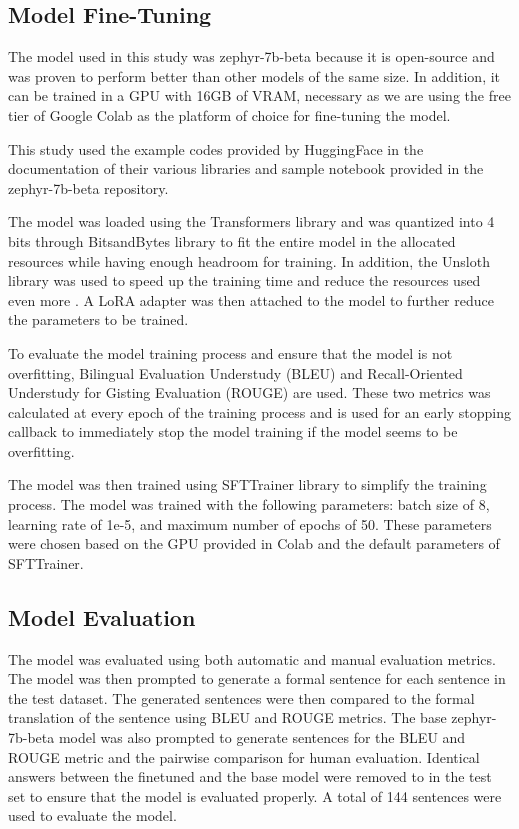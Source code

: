 \subsection{Model Fine-Tuning}
The model used in this study was zephyr-7b-beta because it is open-source and was proven to perform better than other models of the same size. In addition, it can be trained in a GPU with 16GB of VRAM, necessary as we are using the free tier of Google Colab as the platform of choice for fine-tuning the model.

This study used the example codes provided by HuggingFace in the documentation of their various libraries and sample notebook provided in the zephyr-7b-beta repository. 

The model was loaded using the Transformers library and was quantized into 4 bits through BitsandBytes library to fit the entire model in the allocated resources while having enough headroom for training. In addition, the Unsloth library was used to speed up the training time and reduce the resources used even more \cite{unsloth}. A LoRA adapter was then attached to the model to further reduce the parameters to be trained.

To evaluate the model training process and ensure that the model is not overfitting, Bilingual Evaluation Understudy (BLEU) and Recall-Oriented Understudy for Gisting Evaluation (ROUGE) are used. These two metrics was calculated at every epoch of the training process and is used for an early stopping callback to immediately stop the model training if the model seems to be overfitting.

The model was then trained using SFTTrainer library to simplify the training process. The model was trained with the following parameters: batch size of 8, learning rate of 1e-5, and maximum number of epochs of 50. These parameters were chosen based on the GPU provided in Colab and the default parameters of SFTTrainer.

\subsection{Model Evaluation}
The model was evaluated using both automatic and manual evaluation metrics. The model was then prompted to generate a formal sentence for each sentence in the test dataset. The generated sentences were then compared to the formal translation of the sentence using BLEU and ROUGE metrics. The base zephyr-7b-beta model was also prompted to generate sentences for the BLEU and ROUGE metric and the pairwise comparison for human evaluation. Identical answers between the finetuned and the base model were removed to in the test set to ensure that the model is evaluated properly. A total of 144 sentences were used to evaluate the model.

